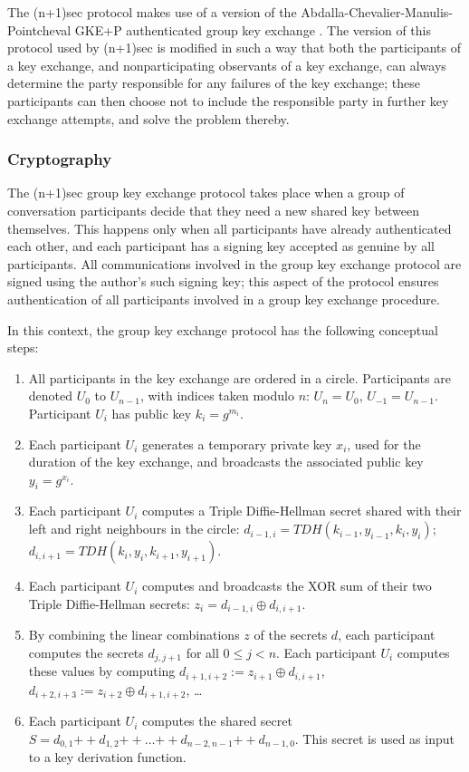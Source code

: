 \documentclass{article}
\def\concat{\mathbin{+\!\!\!+}}
\def\xor{\oplus}
\begin{document}
The (n+1)sec protocol makes use of a version of the Abdalla-Chevalier-Manulis-Pointcheval GKE+P authenticated group key exchange \cite{acmp}.
The version of this protocol used by (n+1)sec is modified in such a way that both the participants of a key exchange, and nonparticipating observants of a key exchange, can always determine the party responsible for any failures of the key exchange; these participants can then choose not to include the responsible party in further key exchange attempts, and solve the problem thereby.


\subsubsection{Cryptography}
\label{sec:cryptography/group-key-exchange/cryptography}

The (n+1)sec group key exchange protocol takes place when a group of conversation participants decide that they need a new shared key between themselves.
This happens only when all participants have already authenticated each other, and each participant has a signing key accepted as genuine by all participants.
All communications involved in the group key exchange protocol are signed using the author's such signing key; this aspect of the protocol ensures authentication of all participants involved in a group key exchange procedure.

In this context, the group key exchange protocol has the following conceptual steps:
\begin{enumerate}
\item All participants in the key exchange are ordered in a circle. Participants are denoted $U_0$ to $U_{n-1}$, with indices taken modulo $n$: $U_n = U_0$, $U_{-1} = U_{n-1}$. Participant $U_i$ has public key $k_i = g^{m_i}$.
\item Each participant $U_i$ generates a temporary private key $x_i$, used for the duration of the key exchange, and broadcasts the associated public key $y_i = g^{x_i}$.
\item Each participant $U_i$ computes a Triple Diffie-Hellman secret shared with their left and right neighbours in the circle: $d_{i-1, i} = TDH(k_{i-1}, y_{i-1}, k_i, y_i)$; $d_{i, i+1} = TDH(k_i, y_i, k_{i+1}, y_{i+1})$.
\item Each participant $U_i$ computes and broadcasts the XOR sum of their two Triple Diffie-Hellman secrets: $z_i = d_{i-1, i} \xor d_{i, i+1}$.
\item By combining the linear combinations $z$ of the secrets $d$, each participant computes the secrets $d_{j, j+1}$ for all $0 \leq j < n$. Each participant $U_i$ computes these values by computing $d_{i+1, i+2} := z_{i+1} \xor d_{i, i+1}$, $d_{i+2, i+3} := z_{i+2} \xor d_{i+1, i+2}$, \ldots
\item Each participant $U_i$ computes the shared secret $S = d_{0, 1} \concat d_{1, 2} \concat \ldots \concat d_{n-2, n-1} \concat d_{n-1, 0}$. This secret is used as input to a key derivation function.
\end{enumerate}
\end{document}
